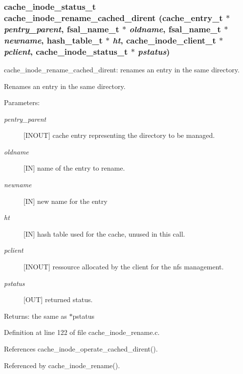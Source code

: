 \subsubsection{\setlength{\rightskip}{0pt plus 5cm}cache\_\-inode\_\-status\_\-t cache\_\-inode\_\-rename\_\-cached\_\-dirent (cache\_\-entry\_\-t $\ast$ {\em pentry\_\-parent}, fsal\_\-name\_\-t $\ast$ {\em oldname}, fsal\_\-name\_\-t $\ast$ {\em newname}, hash\_\-table\_\-t $\ast$ {\em ht}, cache\_\-inode\_\-client\_\-t $\ast$ {\em pclient}, cache\_\-inode\_\-status\_\-t $\ast$ {\em pstatus})}\label{cache__inode__rename_8c_a0}


cache\_\-inode\_\-rename\_\-cached\_\-dirent: renames an entry in the same directory.

Renames an entry in the same directory.

\begin{Desc}
\item[Parameters:]
\begin{description}
\item[{\em pentry\_\-parent}][INOUT] cache entry representing the directory to be managed. \item[{\em oldname}][IN] name of the entry to rename. \item[{\em newname}][IN] new name for the entry \item[{\em ht}][IN] hash table used for the cache, unused in this call. \item[{\em pclient}][INOUT] ressource allocated by the client for the nfs management. \item[{\em pstatus}][OUT] returned status.\end{description}
\end{Desc}
\begin{Desc}
\item[Returns:]the same as $\ast$pstatus \end{Desc}


Definition at line 122 of file cache\_\-inode\_\-rename.c.

References cache\_\-inode\_\-operate\_\-cached\_\-dirent().

Referenced by cache\_\-inode\_\-rename().